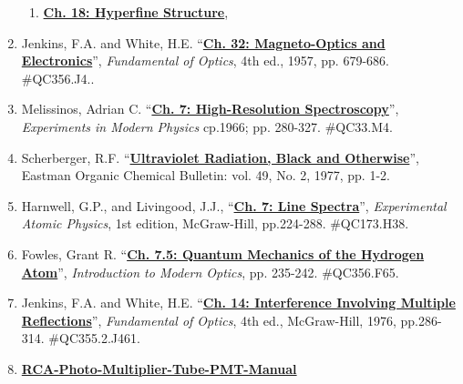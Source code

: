 \documentclass{../lab}
\begin{document}
\begin{enumerate}
\begin{enumerate}
        \item \href{http://physics111.lib.berkeley.edu/Physics111/Reprints/ATM/Introduction\%20to\%20Atomic\%20Harvey\%20E.\%20White/Ch.\%2018\%20hyperfine\%20structure\_OCR.pdf}{\textbf{Ch. 18: Hyperfine Structure}},
    \end{enumerate}

    \item Jenkins, F.A. and White, H.E. ``\href{http://physics111.lib.berkeley.edu/Physics111/Reprints/ATM/07-Magneto-Optics\_and\_Electro-Optics.pdf}{\textbf{Ch. 32: Magneto-Optics and Electronics}}'', \emph{Fundamental of Optics}, 4th ed., 1957, pp. 679-686. \#QC356.J4..
    
    \item Melissinos, Adrian C. ``\href{http://physics111.lib.berkeley.edu/Physics111/Reprints/ATM/06-High-Resolution\_Spectroscopy.pdf}{\textbf{Ch. 7: High-Resolution Spectroscopy}}'', \emph{Experiments in Modern Physics} cp.1966; pp. 280-327. \#QC33.M4.
    
    \item Scherberger, R.F. ``\href{http://physics111.lib.berkeley.edu/Physics111/Reprints/ATM/01-Ultraviolet\_Radiation.pdf}{\textbf{Ultraviolet Radiation, Black and Otherwise}}'', Eastman Organic Chemical Bulletin: vol. 49, No. 2, 1977, pp. 1-2.
    
    \item Harnwell, G.P., and Livingood, J.J., ``\href{http://physics111.lib.berkeley.edu/Physics111/Reprints/ATM/03-Line\_Spectra.pdf}{\textbf{Ch. 7: Line Spectra}}'', \emph{Experimental Atomic Physics}, 1st edition, McGraw-Hill, pp.224-288. \#QC173.H38.
    
    \item Fowles, Grant R. ``\href{http://physics111.lib.berkeley.edu/Physics111/Reprints/ATM/05-Quantum\_Mechanics\_of\_H\_Atom.pdf}{\textbf{Ch. 7.5: Quantum Mechanics of the Hydrogen Atom}}'', \emph{Introduction to Modern Optics}, pp. 235-242. \#QC356.F65.
    
    \item Jenkins, F.A. and White, H.E. ``\href{http://physics111.lib.berkeley.edu/Physics111/Reprints/ATM/04-Interference.pdf}{\textbf{Ch. 14: Interference Involving Multiple Reflections}}'', \emph{Fundamental of Optics}, 4th ed., McGraw-Hill, 1976, pp.286-314. \#QC355.2.J461.
    
    \item \href{http://physics111.lib.berkeley.edu/Physics111/Equipment\_Manuals/RCA\_PMT.pdf}{\textbf{RCA-Photo-Multiplier-Tube-PMT-Manual}}
    

\end{enumerate}
\end{document}
